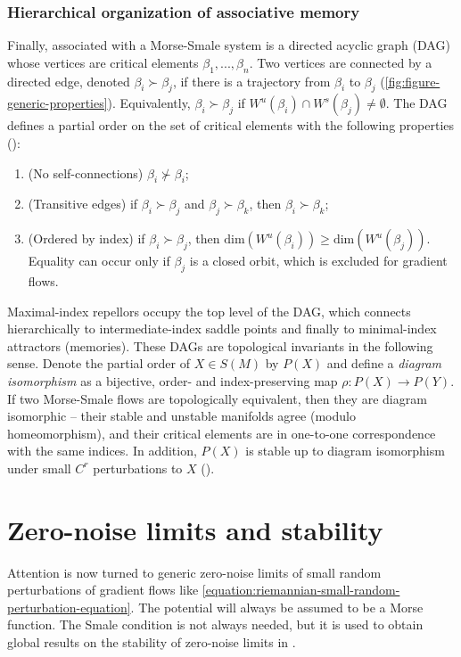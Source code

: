 \documentclass[12pt]{article}
\newcommand\colorAutoref[1]{{\hypersetup{linkcolor=blue}\autoref{#1}}}  %
\begin{document}
\subsubsection{Hierarchical organization of associative memory}
\label{subsubsection:DAG}
Finally, associated with a Morse-Smale system is a directed acyclic graph (DAG) whose vertices are critical elements $\beta_1,...,\beta_n$. Two vertices are connected by a directed edge, denoted $\beta_i \succ \beta_j$, if there is a trajectory from $\beta_i$ to $\beta_j$ (\colorAutoref{fig:figure-generic-properties}). Equivalently, $\beta_i \succ \beta_j$ if $ W^u(\beta_i) \cap W^s(\beta_j) \neq \emptyset$. The DAG defines a partial order on the set of critical elements with the following properties (\cite{meyer1968energy,smale1960morse}): 
\begin{enumerate}[itemsep=0pt]
    \item[\textbullet] (No self-connections) $\beta_i \nsucc \beta_i$;
    \item[\textbullet] (Transitive edges) if $\beta_i \succ \beta_j$ and $\beta_j \succ \beta_k$, then $\beta_i \succ \beta_k$;
    \item[\textbullet](Ordered by index) if $\beta_i \succ \beta_j$, then $\text{dim}(W^u(\beta_i)) \geq \text{dim}(W^u(\beta_j))$. Equality can occur only if $\beta_j$ is a closed orbit, which is excluded for gradient flows.
\end{enumerate}

Maximal-index repellors occupy the top level of the DAG, which connects hierarchically to intermediate-index saddle points and finally to minimal-index attractors (memories). These DAGs are topological invariants in the following sense. Denote the partial order of $X \in S(M)$ by $P(X)$ and define a \textit{diagram isomorphism} as a bijective, order- and index-preserving map $\rho: P(X) \rightarrow P(Y)$. If two Morse-Smale flows are topologically equivalent, then they are diagram isomorphic -- their stable and unstable manifolds agree (modulo homeomorphism), and their critical elements are in one-to-one correspondence with the same indices. In addition, $P(X)$ is stable up to diagram isomorphism under small $C^r$ perturbations to $X$ (\cite{PALIS1969385}).


\section{Zero-noise limits and stability}
\label{section:diffusion-zero-noise-limit}
Attention is now turned to generic zero-noise limits of small random perturbations of gradient flows like \eqref{equation:riemannian-small-random-perturbation-equation}. The potential will always be assumed to be a Morse function. The Smale condition is not always needed, but it is used to obtain global results on the stability of zero-noise limits in .
\end{document}
